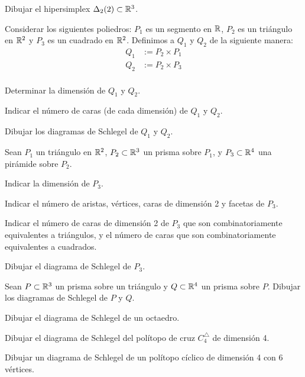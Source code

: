 \documentclass[a4paper,12pt]{article}
\newcommand{\Ppolar}[1]{#1^{\bigtriangleup}}
\begin{document}
\begin{exerciselist}
\item Dibujar el hipersimplex $\Delta_2(2) \subset \mathbb{R}^3$.

\item Considerar los siguientes poliedros: $P_1$ es un segmento en $\mathbb{R}$, $P_2$ es un triángulo en $\mathbb{R}^2$ y $P_3$ es un cuadrado en $\mathbb{R}^2$. Definimos a $Q_1$ y $Q_2$ de la siguiente manera:
\begin{align*}
Q_1 &:= P_2 \times P_1\\
Q_2 &:= P_2 \times P_3\\
\end{align*}

\begin{exerciselist}
\item Determinar la dimensión de $Q_1$ y $Q_2$.
\item Indicar el número de caras (de cada dimensión) de $Q_1$ y $Q_2$.
\item Dibujar los diagramas de Schlegel de $Q_1$ y $Q_2$.
\end{exerciselist}

\item Sean $P_1$ un triángulo en $\mathbb{R}^2$, $P_2 \subset \mathbb{R}^3$ un prisma sobre $P_1$, y $P_3 \subset \mathbb{R}^4$ una pirámide sobre $P_2$.

\begin{exerciselist}
\item Indicar la dimensión de $P_3$.
\item Indicar el número de aristas, vértices, caras de dimensión 2 y facetas de $P_3$.
\item Indicar el número de caras de dimensión 2 de $P_3$ que son combinatoriamente equivalentes a triángulos, y el número de caras que son combinatoriamente equivalentes a cuadrados.
\item Dibujar el diagrama de Schlegel de $P_3$.
\end{exerciselist}

\item Sean $P \subset \mathbb{R}^3$ un prisma sobre un triángulo y $Q \subset \mathbb{R}^4$ un prisma sobre $P$. Dibujar los diagramas de Schlegel de $P$ y $Q$.

\item Dibujar el diagrama de Schlegel de un octaedro.

\item Dibujar el diagrama de Schlegel del polítopo de cruz $\Ppolar{C_4}$ de dimensión 4.

\item Dibujar un diagrama de Schlegel de un polítopo cíclico de dimensión 4 con 6 vértices.

\end{exerciselist}
\end{document}
